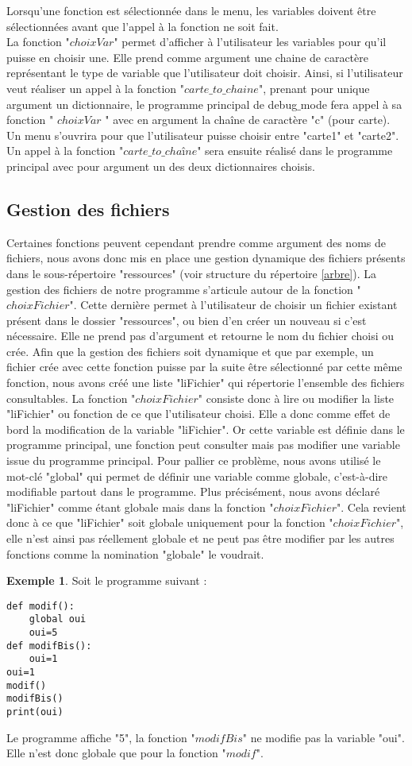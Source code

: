 \documentclass[10pt,a4paper,french,titlepage]{article}
\theoremstyle{definition}
\newtheorem{exmp}{Exemple}
\begin{document}
Lorsqu'une fonction est sélectionnée dans le menu, les variables doivent être sélectionnées avant que l'appel à la fonction ne soit fait.\\ La fonction "$choixVar$" permet d'afficher à l'utilisateur les variables pour qu'il puisse en choisir une. Elle prend comme argument une chaine de caractère représentant le type de variable que l'utilisateur doit choisir. Ainsi, si l'utilisateur veut réaliser un appel à la fonction "$carte\_to\_chaine$", prenant pour unique argument un dictionnaire, le programme principal de debug$\_$mode fera appel à sa fonction " $choixVar$ " avec en argument la chaîne de caractère "c" (pour carte). Un menu s'ouvrira pour que l'utilisateur puisse choisir entre "carte1" et "carte2". Un appel à la fonction "$carte\_to\_chaîne$" sera ensuite réalisé dans le programme principal avec pour argument un des deux dictionnaires choisis.


\subsection{Gestion des fichiers}
Certaines fonctions peuvent cependant prendre comme argument des noms de fichiers, nous avons donc mis en place une gestion dynamique des fichiers présents dans le sous-répertoire "ressources" (voir structure du répertoire \ref{arbre}). La gestion des fichiers de notre programme s'articule autour de la fonction "$choixFichier$". Cette dernière permet à l'utilisateur de choisir un fichier existant présent dans le dossier "ressources", ou bien d'en créer un nouveau si c'est nécessaire. Elle ne prend pas d'argument et retourne le nom du fichier choisi ou crée. Afin que la gestion des fichiers soit dynamique et que par exemple, un fichier crée avec cette fonction puisse par la suite être sélectionné par cette même fonction, nous avons créé une liste "liFichier" qui répertorie l'ensemble des fichiers consultables. La fonction "$choixFichier$" consiste donc à lire ou modifier la liste "liFichier" ou fonction de ce que l'utilisateur choisi. Elle a donc comme effet de bord la modification de la variable "liFichier". Or cette variable est définie dans le programme principal, une fonction peut consulter mais pas modifier une variable issue du programme principal. Pour pallier ce problème, nous avons utilisé le mot-clé "global" qui permet de définir une variable comme globale, c’est-à-dire modifiable partout dans le programme. Plus précisément, nous avons déclaré "liFichier" comme étant globale mais dans la fonction "$choixFichier$". Cela revient donc à ce que "liFichier" soit globale uniquement pour la fonction "$choixFichier$", elle n'est ainsi pas réellement globale et ne peut pas être modifier par les autres fonctions comme la nomination "globale" le voudrait.
\begin{exmp}
Soit le programme suivant :
\begin{lstlisting}
def modif():
    global oui
    oui=5
def modifBis():
    oui=1
oui=1
modif()
modifBis()
print(oui)
\end{lstlisting}
Le programme affiche "5", la fonction "$modifBis$" ne modifie pas la variable "oui". Elle n'est donc globale que pour la fonction "$modif$".
\end{exmp}
\end{document}
